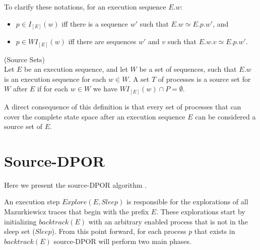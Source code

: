 To clarify these notations, for an execution sequence $E.w$:
\begin{itemize}
    \item  $p \in I_{[E]}(w)$ iff there is a sequence $w'$ such that $E.w \simeq E.p.w'$, and
    \item  $p \in WI_{[E]}(w)$ iff there are sequences $w'$ and $v$ such that $E.w.v \simeq E.p.w'$.
\end{itemize}

\begin{definition}{(Source Sets)}\\
Let $E$ be an execution sequence,
and let $W$ be a set of sequences, such that $E.w$ is an execution
sequence for each $w \in W$. A set $T$ of processes is a source set for
$W$ after $E$ if for each $w \in W$ we have $WI_{[E]}(w) \cap P  = \emptyset$.
\end{definition}

A direct consequence of this definition is that every 
set of processes that can cover the complete state space after an execution sequence $E$
can be considered a source set of $E$.

\section{Source-DPOR}
Here we present the source-DPOR algorithm \cite{AbdullaAronisJohnssonSagonasDPOR2014}.

\begin{algorithm}
    \caption{Source-DPOR}
    \label{Source}
\end{algorithm}

An execution step $Explore(E, Sleep)$ is responsible for the explorations of all Mazurkiewicz traces 
that begin with the prefix $E$. These explorations start by initializing $backtrack(E)$ with an arbitrary enabled process
that is not in the sleep set ($Sleep$). From this point forward, for each process $p$ that exists in $backtrack(E)$
source-DPOR will perform two main phases.

